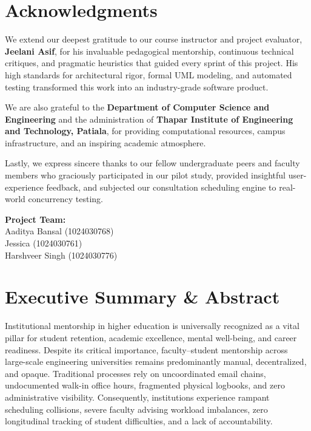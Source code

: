 \documentclass[11pt,a4paper]{article}
\begin{document}
\newpage
\section*{Acknowledgments}
We extend our deepest gratitude to our course instructor and project evaluator, \textbf{Jeelani Asif}, for his invaluable pedagogical mentorship, continuous technical critiques, and pragmatic heuristics that guided every sprint of this project. His high standards for architectural rigor, formal UML modeling, and automated testing transformed this work into an industry-grade software product.

We are also grateful to the \textbf{Department of Computer Science and Engineering} and the administration of \textbf{Thapar Institute of Engineering and Technology, Patiala}, for providing computational resources, campus infrastructure, and an inspiring academic atmosphere.

Lastly, we express sincere thanks to our fellow undergraduate peers and faculty members who graciously participated in our pilot study, provided insightful user-experience feedback, and subjected our consultation scheduling engine to real-world concurrency testing.

\vspace{1.5cm}
\noindent \textbf{Project Team:}\\
Aaditya Bansal (1024030768)\\
Jessica (1024030761)\\
Harshveer Singh (1024030776)

\newpage
\tableofcontents
\vspace{0.8cm}
\listoffigures
\vspace{0.8cm}
\listoftables
\newpage
{}

\section{Executive Summary \& Abstract}
Institutional mentorship in higher education is universally recognized as a vital pillar for student retention, academic excellence, mental well-being, and career readiness. Despite its critical importance, faculty--student mentorship across large-scale engineering universities remains predominantly manual, decentralized, and opaque. Traditional processes rely on uncoordinated email chains, undocumented walk-in office hours, fragmented physical logbooks, and zero administrative visibility. Consequently, institutions experience rampant scheduling collisions, severe faculty advising workload imbalances, zero longitudinal tracking of student difficulties, and a lack of accountability.
\end{document}
